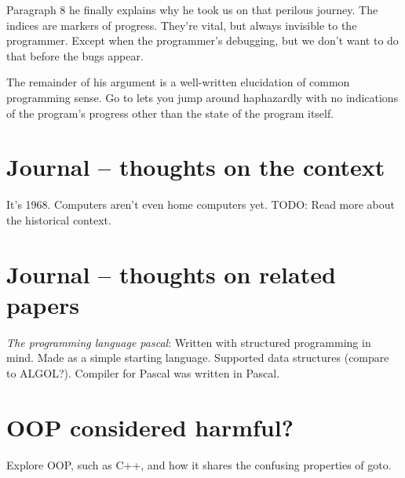 \documentclass{journal}
\begin{document}
Paragraph 8 he finally explains why he took us on that perilous journey. The indices are markers of progress. They're vital, but always invisible to the programmer. Except when the programmer's debugging, but we don't want to do that before the bugs appear.

The remainder of his argument is a well-written elucidation of common programming sense. Go to lets you jump around haphazardly with no indications of the program's progress other than the state of the program itself. 

\section{Journal -- thoughts on the context}
It's 1968. Computers aren't even home computers yet. TODO: Read more about the historical context.

\section{Journal -- thoughts on related papers}
\textit{The programming language pascal}: Written with structured programming in mind. Made as a simple starting language. Supported data structures (compare to ALGOL?). Compiler for Pascal was written in Pascal.

\section{OOP considered harmful?}
Explore OOP, such as C++, and how it shares the confusing properties of goto.



\end{document}
